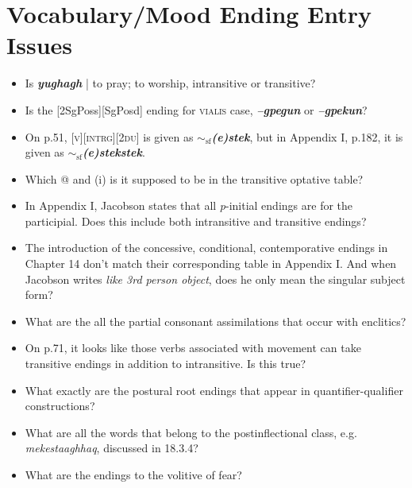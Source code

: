 \documentclass{article}
\begin{document}

\section{Vocabulary/Mood Ending Entry Issues}

\begin{itemize}
\renewcommand\labelitemi{$\cdot$}

\item Is \textit{\textbf{yughagh}} | to pray; to worship, intransitive or transitive?

\item Is the [2SgPoss][SgPosd] ending for \textsc{vialis} case, \textit{\textbf{--gpegun}} or \textit{\textbf{--gpekun}}?

\item On p.51, \textsc{[v][intrg][2du]} is given as \textit{\textbf{$\sim_\text{sf}$(e)stek}}, but in Appendix I, p.182, it is given as \textit{\textbf{$\sim_\text{sf}$(e)stekstek}}.

\item Which @ and (i) is it supposed to be in the transitive optative table?

\item In Appendix I, Jacobson states that all \textit{p}-initial endings are for the participial.
%
Does this include both intransitive and transitive endings?

\item The introduction of the concessive, conditional, contemporative endings in Chapter 14 don't match their corresponding table in Appendix I.
%
And when Jacobson writes \textit{like 3rd person object}, does he only mean the singular subject form?

\item What are the all the partial consonant assimilations that occur with enclitics?

\item On p.71, it looks like those verbs associated with movement can take transitive endings in addition to intransitive.
%
Is this true?

\item What exactly are the postural root endings that appear in quantifier-qualifier constructions?

\item What are all the words that belong to the postinflectional class, e.g. \textit{mekestaaghhaq}, discussed in 18.3.4?

\item What are the endings to the volitive of fear?

\end{itemize}
\end{document}

